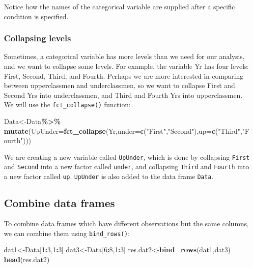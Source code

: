 \documentclass[
]{book}
\newenvironment{Shaded}{\begin{snugshade}}{\end{snugshade}}
\newcommand{\AttributeTok}[1]{\textcolor[rgb]{0.13,0.29,0.53}{#1}}
\newcommand{\DecValTok}[1]{\textcolor[rgb]{0.00,0.00,0.81}{#1}}
\newcommand{\FunctionTok}[1]{\textcolor[rgb]{0.13,0.29,0.53}{\textbf{#1}}}
\newcommand{\NormalTok}[1]{#1}
\newcommand{\OtherTok}[1]{\textcolor[rgb]{0.56,0.35,0.01}{#1}}
\newcommand{\SpecialCharTok}[1]{\textcolor[rgb]{0.81,0.36,0.00}{\textbf{#1}}}
\newcommand{\StringTok}[1]{\textcolor[rgb]{0.31,0.60,0.02}{#1}}
\begin{document}
Notice how the names of the categorical variable are supplied after a specific condition is specified.

\hypertarget{collapsing-levels}{%
\subsubsection{Collapsing levels}\label{collapsing-levels}}

Sometimes, a categorical variable has more levels than we need for our analysis, and we want to collapse some levels. For example, the variable Yr has four levels: First, Second, Third, and Fourth. Perhaps we are more interested in comparing between upperclassmen and underclassmen, so we want to collapse First and Second Yrs into underclassmen, and Third and Fourth Yrs into upperclassmen. We will use the \texttt{fct\_collapse()} function:

\begin{Shaded}
\begin{Highlighting}[]
\NormalTok{Data}\OtherTok{\textless{}{-}}\NormalTok{Data}\SpecialCharTok{\%\textgreater{}\%}
  \FunctionTok{mutate}\NormalTok{(}\AttributeTok{UpUnder=}\FunctionTok{fct\_collapse}\NormalTok{(Yr,}\AttributeTok{under=}\FunctionTok{c}\NormalTok{(}\StringTok{"First"}\NormalTok{,}\StringTok{"Second"}\NormalTok{),}\AttributeTok{up=}\FunctionTok{c}\NormalTok{(}\StringTok{"Third"}\NormalTok{,}\StringTok{"Fourth"}\NormalTok{)))}
\end{Highlighting}
\end{Shaded}

We are creating a new variable called \texttt{UpUnder}, which is done by collapsing \texttt{First} and \texttt{Second} into a new factor called \texttt{under}, and collapsing \texttt{Third} and \texttt{Fourth} into a new factor called \texttt{up}. \texttt{UpUnder} is also added to the data frame \texttt{Data}.

\hypertarget{combine-data-frames-1}{%
\subsection{Combine data frames}\label{combine-data-frames-1}}

To combine data frames which have different observations but the same columns, we can combine them using \texttt{bind\_rows()}:

\begin{Shaded}
\begin{Highlighting}[]
\NormalTok{dat1}\OtherTok{\textless{}{-}}\NormalTok{Data[}\DecValTok{1}\SpecialCharTok{:}\DecValTok{3}\NormalTok{,}\DecValTok{1}\SpecialCharTok{:}\DecValTok{3}\NormalTok{]}
\NormalTok{dat3}\OtherTok{\textless{}{-}}\NormalTok{Data[}\DecValTok{6}\SpecialCharTok{:}\DecValTok{8}\NormalTok{,}\DecValTok{1}\SpecialCharTok{:}\DecValTok{3}\NormalTok{]}
\NormalTok{res.dat2}\OtherTok{\textless{}{-}}\FunctionTok{bind\_rows}\NormalTok{(dat1,dat3)}
\FunctionTok{head}\NormalTok{(res.dat2)}
\end{Highlighting}
\end{Shaded}
\end{document}
